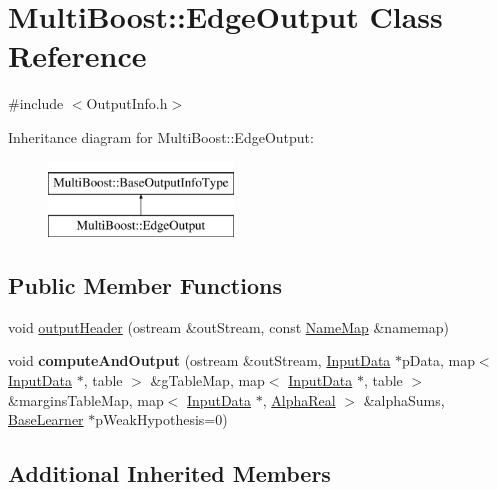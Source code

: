\hypertarget{classMultiBoost_1_1EdgeOutput}{\section{Multi\-Boost\-:\-:Edge\-Output Class Reference}
\label{classMultiBoost_1_1EdgeOutput}
}


{\ttfamily \#include $<$Output\-Info.\-h$>$}

Inheritance diagram for Multi\-Boost\-:\-:Edge\-Output\-:\begin{figure}[H]
\begin{center}
\leavevmode
\includegraphics[height=2.000000cm]{classMultiBoost_1_1EdgeOutput}
\end{center}
\end{figure}
\subsection*{Public Member Functions}
\begin{DoxyCompactItemize}
\item 
void \hyperlink{classMultiBoost_1_1EdgeOutput_abfdaafbb0ce5c69b82342ec1277e4e0c}{output\-Header} (ostream \&out\-Stream, const \hyperlink{classMultiBoost_1_1NameMap}{Name\-Map} \&namemap)
\item 
\hypertarget{classMultiBoost_1_1EdgeOutput_aa68d31b1c4175146519256260c84199a}{void {\bfseries compute\-And\-Output} (ostream \&out\-Stream, \hyperlink{classMultiBoost_1_1InputData}{Input\-Data} $\ast$p\-Data, map$<$ \hyperlink{classMultiBoost_1_1InputData}{Input\-Data} $\ast$, table $>$ \&g\-Table\-Map, map$<$ \hyperlink{classMultiBoost_1_1InputData}{Input\-Data} $\ast$, table $>$ \&margins\-Table\-Map, map$<$ \hyperlink{classMultiBoost_1_1InputData}{Input\-Data} $\ast$, \hyperlink{Defaults_8h_a80184c4fd10ab70a1a17c5f97dcd1563}{Alpha\-Real} $>$ \&alpha\-Sums, \hyperlink{classMultiBoost_1_1BaseLearner}{Base\-Learner} $\ast$p\-Weak\-Hypothesis=0)}\label{classMultiBoost_1_1EdgeOutput_aa68d31b1c4175146519256260c84199a}

\end{DoxyCompactItemize}
\subsection*{Additional Inherited Members}



